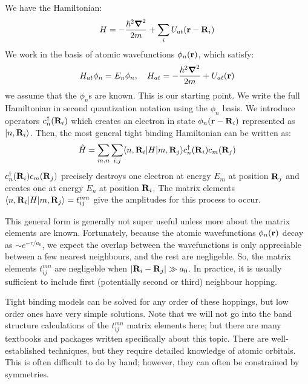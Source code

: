 We have the Hamiltonian:
\begin{equation}
    H = -\frac{\hbar^2\nabla^2}{2m} + \sum_i U_{at}(\v{r} - \v{R}_i)
\end{equation}
We work in the basis of atomic wavefunctions $\phi_n(\mathbf{r})$, which satisfy:
\begin{equation}
    H_{at}\phi_n = E_n\phi_n, \quad H_{at} = -\frac{\hbar^2\nabla^2}{2m} + U_{at}(\v{r})
\end{equation}
we assume that the $\phi_n$s are known. This is our starting point. We write the full Hamiltonian in second quantization notation using the $\phi_n$ basis. We introduce operators $c_n^\dagger (\mathbf{R}_i)$ which creates an electron in state $\phi_n(\mathbf{r} - \mathbf{R}_i)$ represented as $\lvert n, \mathbf{R}_i \rangle$. Then, the most general tight binding Hamiltonian can be written as:
\begin{equation}
    \hat{H} = \sum_{m, n}\sum_{i, j}\langle n, \mathbf{R}_i \rvert H\lvert m, \mathbf{R}_j \rangle c^\dagger_n(\mathbf{R}_i)c_m(\mathbf{R}_j)
\end{equation}
$c^\dagger_n(\mathbf{R}_i)c_m(\mathbf{R}_j)$ precisely destroys one electron at energy $E_m$ at position $\mathbf{R}_j$ and creates one at energy $E_n$ at position $\mathbf{R}_i$. The matrix elements $\langle n, \mathbf{R}_i \rvert H\lvert m, \mathbf{R}_j \rangle = t_{ij}^{mn}$ give the amplitudes for this process to occur.  

This general form is generally not super useful unless more about the matrix elements are known. Fortunately, because the atomic wavefunctions $\phi_n(\mathbf{r})$ decay as $\sim e^{-r/a_0}$, we expect the overlap between the wavefunctions is only appreciable between a few nearest neighbours, and the rest are negligeble. So, the matrix elements $t_{ij}^{mn}$ are negligeble when $\lvert \mathbf{R}_i - \mathbf{R}_j \rvert \gg a_0$. In practice, it is usually sufficient to include first (potentially second or third) neighbour hopping.

Tight binding models can be solved for any order of these hoppings, but low order ones have very simple solutions. Note that we will not go into the band structure calculations of the $t_{ij}^{mn}$ matrix elements here; but there are many textbooks and packages written specifically about this topic. There are well-established techniques, but they require detailed knowledge of atomic orbitals. This is often difficult to do by hand; however, they can often be constrained by symmetries.

